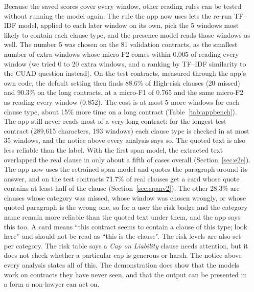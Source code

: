 Because the saved scores cover every window, other reading rules can be tested without running the model again. The rule the app now uses lets the re-run TF--IDF model, applied to each later window on its own, pick the 5 windows most likely to contain each clause type, and the presence model reads those windows as well. The number 5 was chosen on the 81 validation contracts, as the smallest number of extra windows whose micro-F2 comes within 0.005 of reading every window (we tried 0 to 20 extra windows, and a ranking by TF--IDF similarity to the CUAD question instead). On the test contracts, measured through the app's own code, the default setting then finds 88.6\% of High-risk clauses (20 missed) and 90.3\% on the long contracts, at a micro-F1 of 0.765 and the same micro-F2 as reading every window (0.852). The cost is at most 5 more windows for each clause type, about 15\% more time on a long contract (Table~\ref{tab:appbench}). The app still never reads most of a very long contract: for the longest test contract (289{,}615 characters, 193 windows) each clause type is checked in at most 35 windows, and the notice above every analysis says so. The quoted text is also less reliable than the label. With the first span model, the extracted text overlapped the real clause in only about a fifth of cases overall (Section~\ref{sec:e2e}). The app now uses the retrained span model and quotes the paragraph around its answer, and on the test contracts 71.7\% of real clauses get a card whose quote contains at least half of the clause (Section~\ref{sec:spanv2}). The other 28.3\% are clauses whose category was missed, whose window was chosen wrongly, or whose quoted paragraph is the wrong one, so for a user the risk badge and the category name remain more reliable than the quoted text under them, and the app says this too. A card means ``this contract seems to contain a clause of this type; look here'' and should not be read as ``this is the clause''. The risk levels are also set per category. The risk table says a \emph{Cap on Liability} clause needs attention, but it does not check whether a particular cap is generous or harsh. The notice above every analysis states all of this. The demonstration does show that the models work on contracts they have never seen, and that the output can be presented in a form a non-lawyer can act on.

